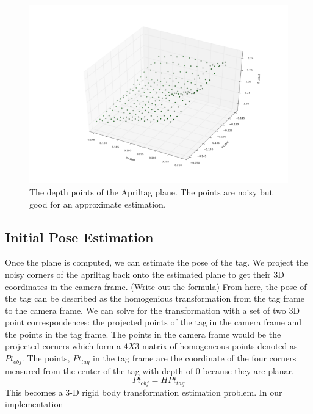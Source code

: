 \begin{figure}
\centering
\includegraphics[width=\columnwidth]{figs/depth_plane_fig}
\caption{The depth points of the Apriltag plane. The points are noisy but good for an approximate estimation.}
\label{fig:calib}
\end{figure}

\subsection{Initial Pose Estimation}
Once the plane is computed, we can estimate the pose of the tag. We project the noisy corners of the apriltag back onto the estimated plane to get their 3D coordinates in the camera frame. (Write out the formula)  From here, the pose of the tag can be described as the homogenious transformation from the tag frame to the camera frame. We can solve for the transformation with a set of two 3D point correspondences: the projected points of the tag in the camera frame and the points in the tag frame. The points in the camera frame would be the projected corners which form a $4X3$ matrix of homogeneous points denoted as $Pt_{obj}$. The points, $Pt_{tag}$ in the tag frame are the coordinate of the four corners measured from the center of the tag with depth of 0 because they are planar. 
$$Pt_{obj} = H Pt_{tag}$$
This becomes a 3-D rigid body transformation estimation problem. In our implementation 



